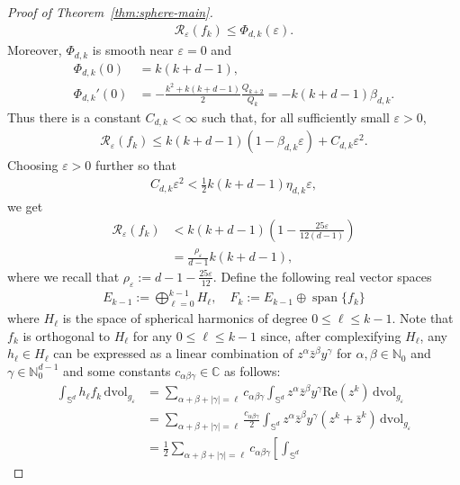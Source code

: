 \documentclass[11pt,reqno]{amsart}
\numberwithin{equation}{section}
\theoremstyle{definition}
\theoremstyle{remark}
\def\bC {\mathbb{C}}
\def\bN {\mathbb{N}}
\def\cR {\mathcal{R}}
\renewcommand\Re{\mathrm{Re}\,}
\renewcommand{\Re}{\mathrm{Re}}
\newcommand{\0}{\emptyset}
\newcommand{\alp}{\alpha}
\newcommand{\veps}{\varepsilon}
\newcommand{\dvol}{\,\mathrm{dvol}}
\begin{document}
\begin{proof}[Proof of Theorem~\ref{thm:sphere-main}]
\begin{align}
        \cR_\veps(f_k)\leq \Phi_{d,k}(\veps).
\end{align}
Moreover, $\Phi_{d,k}$ is smooth near $\veps=0$ and
\begin{align}
        \Phi_{d,k}(0)&=k(k+d-1),\\
        \Phi_{d,k}'(0)&=
        -\frac{k^2+k(k+d-1)}{2}\frac{Q_{k+2}}{Q_k}
        =-k(k+d-1)\beta_{d,k}.
\end{align}
Thus there is a constant $C_{d,k}<\infty$ such that, for all sufficiently small
$\veps>0$,
\begin{align}
        \cR_\veps(f_k)
        \leq
        k(k+d-1)(1-\beta_{d,k}\veps)+C_{d,k}\veps^2.
\end{align}
Choosing $\veps>0$ further so that
\begin{align}
        C_{d,k}\veps^2
        <
        \frac12 k(k+d-1)\eta_{d,k}\veps,
\end{align}
we get
\begin{align}\label{eqn:f_k-ub}
        \mathcal{R}_\veps(f_k)
        &<
        k(k+d-1)\left(1-\frac{25\veps}{12(d-1)}\right)\\
        &=
        \frac{\rho_\veps}{d-1}k(k+d-1),
\end{align}
where we recall that $\rho_\veps:=d-1-\frac{25\veps}{12}.$ 
Define the following real vector spaces
\begin{align}
  E_{k-1}:=\bigoplus_{\ell=0}^{k-1}H_{\ell},\quad F_k:= E_{k-1} \oplus \operatorname{span}\{f_k\}  
\end{align}
where $H_\ell$ is the space of spherical harmonics of degree $0\leq \ell\leq k-1$. Note that $f_k$ is orthogonal to $H_\ell$ for any $0\leq \ell\leq k-1$ since, after complexifying $H_\ell$, any $h_{\ell}\in H_\ell$ can be expressed as a linear combination of $z^\alp \bar{z}^\beta y^\gamma$ for $\alp,\beta\in \bN_0$ and $\gamma \in \bN_0^{d-1}$ and some constants $c_{\alp\beta\gamma}\in \bC$ as follows:
\begin{align}
    \int_{\mathbb{S}^d} h_{\ell} f_k \dvol_{g_\veps} &= \sum_{\alpha+\beta+|\gamma|=\ell}c_{\alpha\beta\gamma}\int_{\mathbb{S}^d} z^\alp \bar{z}^\beta y^\gamma  \Re(z^k) \dvol_{g_\veps} \\
    &= \sum_{\alpha+\beta+|\gamma|=\ell}\frac{c_{\alpha\beta\gamma}}{2}\int_{\mathbb{S}^d} z^\alp \bar{z}^\beta y^\gamma (z^k+\bar{z}^k)   \dvol_{g_\veps}\\
    &= \frac12
    \sum_{\alpha+\beta+|\gamma|=\ell}
    c_{\alpha\beta\gamma}
    \left[
    \int_{\mathbb S^d}

\end{align}
\end{proof}
\end{document}
